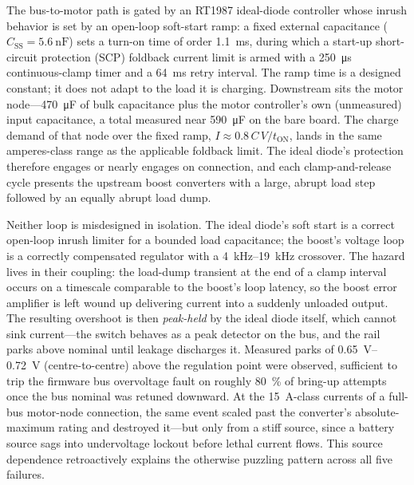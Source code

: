 The bus-to-motor path is gated by an RT1987 ideal-diode controller whose inrush
behavior is set by an open-loop soft-start ramp: a fixed external capacitance
($C_\mathrm{SS}=\SI{5.6}{\nano\farad}$) sets a turn-on time of order
\SI{1.1}{\milli\second}, during which a start-up short-circuit protection (SCP)
foldback current limit is armed with a \SI{250}{\micro\second} continuous-clamp
timer and a \SI{64}{\milli\second} retry interval. The ramp time is a designed
constant; it does not adapt to the load it is charging. Downstream sits the motor
node---\SI{470}{\micro\farad} of bulk capacitance plus the motor controller's own
(unmeasured) input capacitance, a total measured near \SI{590}{\micro\farad} on the
bare board. The charge demand of that node over the fixed ramp,
$I \approx 0.8\,C\,V/t_\mathrm{ON}$, lands in the same amperes-class range as the
applicable foldback limit. The ideal diode's protection therefore engages or nearly
engages on connection, and each clamp-and-release cycle presents the upstream boost
converters with a large, abrupt load step followed by an equally abrupt load dump.

Neither loop is misdesigned in isolation. The ideal diode's soft start is a
correct open-loop inrush limiter for a bounded load capacitance; the boost's
voltage loop is a correctly compensated regulator with a \SIrange{4}{19}{\kilo\hertz}
crossover. The hazard lives in their coupling: the load-dump transient at the end
of a clamp interval occurs on a timescale comparable to the boost's loop latency,
so the boost error amplifier is left wound up delivering current into a suddenly
unloaded output. The resulting overshoot is then \emph{peak-held} by the ideal
diode itself, which cannot sink current---the switch behaves as a peak detector on
the bus, and the rail parks above nominal until leakage discharges it.
Measured parks of \SIrange{0.65}{0.72}{\volt} (centre-to-centre) above the
regulation point were observed, sufficient to trip the firmware bus overvoltage
fault on roughly \SI{80}{\percent} of bring-up attempts once the bus nominal was
retuned downward. At the \SI{15}{\ampere}-class currents of a full-bus motor-node
connection, the same event scaled past the converter's absolute-maximum rating and
destroyed it---but only from a stiff source, since a battery source sags into
undervoltage lockout before lethal current flows. This source dependence
retroactively explains the otherwise puzzling pattern across all five failures.

